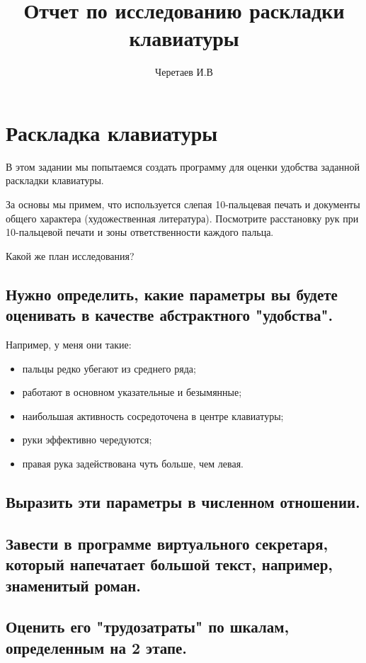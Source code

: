 \documentclass[14pt]{article} %
\title{Отчет по исследованию раскладки клавиатуры}
\author{Черетаев И.В}
\begin{document}
\maketitle

\section{Раскладка клавиатуры}


В этом задании мы попытаемся создать программу для оценки удобства заданной раскладки клавиатуры.

За основы мы примем, что используется слепая 10-пальцевая печать и документы общего характера (художественная литература). Посмотрите расстановку рук при 10-пальцевой печати и зоны ответственности каждого пальца.

Какой же план исследования?

\subsection {Нужно определить, какие параметры вы будете оценивать в качестве абстрактного "удобства".}

Например, у меня они такие:
\begin{itemize}
\item
пальцы редко убегают из среднего ряда;
\item
работают в основном указательные и безымянные;
\item
наибольшая активность сосредоточена в центре клавиатуры;
\item
руки эффективно чередуются;
\item
правая рука задействована чуть больше, чем левая.
\end{itemize}
\subsection {Выразить эти параметры в численном отношении.}
\subsection {Завести в программе виртуального секретаря, который напечатает большой текст, например, знаменитый роман.}
\subsection {Оценить его "трудозатраты" по шкалам, определенным на 2 этапе.}
\end{document}
